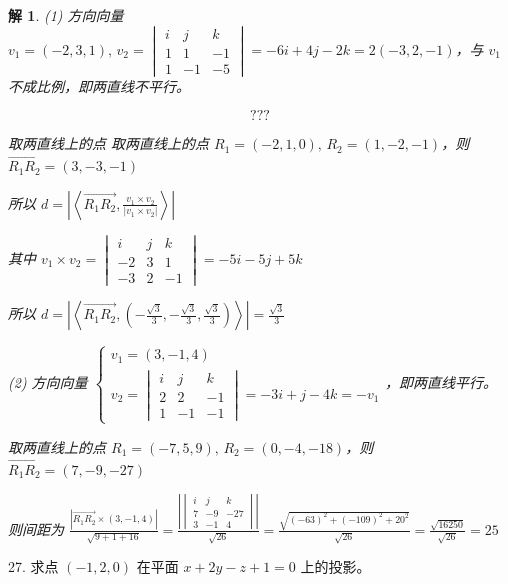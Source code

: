 \documentclass[a4paper,12pt]{article}
\newtheorem*{解}{解}
\begin{document}
\begin{解}
(1) 方向向量 $
    v_1=(-2,3,1),\,v_2=\begin{vmatrix}
        i & j  & k  \\
        1 & 1  & -1 \\
        1 & -1 & -5
    \end{vmatrix}=-6i+4j-2k=2(-3,2,-1)
$，与 $v_1$ 不成比例，即两直线不平行。

$$???$$

取两直线上的点 取两直线上的点 $R_1=(-2,1,0),\,R_2=(1,-2,-1)$，则 $\overrightarrow{R_1R_2}=(3,-3,-1)$

所以 $d=\left|\left<\overrightarrow{R_1R_2},\frac{v_1\times v_2}{\left|v_1\times v_2\right|}\right>\right|$

其中 $v_1\times v_2=\begin{vmatrix}
        i  & j & k  \\
        -2 & 3 & 1  \\
        -3 & 2 & -1
    \end{vmatrix}=-5i-5j+5k$

所以 $d=\left|\left<\overrightarrow{R_1R_2},\left(-\frac{\sqrt{3}}{3},-\frac{\sqrt{3}}{3},\frac{\sqrt{3}}{3}\right)\right>\right|=\frac{\sqrt{3}}{3}$

(2) 方向向量 $\begin{cases}
        v_1=(3,-1,4) \\
        v_2=\begin{vmatrix}
                i & j  & k  \\
                2 & 2  & -1 \\
                1 & -1 & -1
            \end{vmatrix}=-3i+j-4k=-v_1
    \end{cases}$，即两直线平行。

取两直线上的点 $R_1=(-7,5,9),\,R_2=(0,-4,-18)$，则 $\overrightarrow{R_1R_2}=(7,-9,-27)$

则间距为 $\frac{\left|\overrightarrow{R_1R_2}\times(3,-1,4)\right|}{\sqrt{9+1+16}}=\frac{\left|\begin{vmatrix}
            i & j  & k   \\
            7 & -9 & -27 \\
            3 & -1 & 4
        \end{vmatrix}\right|}{\sqrt{26}}=\frac{\sqrt{(-63)^2+(-109)^2+20^2}}{\sqrt{26}}=\frac{\sqrt{16250}}{\sqrt{26}}=25$
\end{解}

27. 求点 $(-1, 2, 0)$ 在平面 $x + 2y - z + 1 = 0$ 上的投影。
\end{document}
